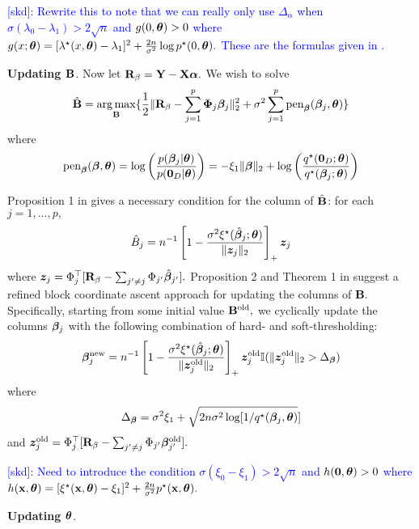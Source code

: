 \textcolor{blue}{[skd]: Rewrite this to note that we can really only use $\Delta_{\alpha}$ when $\sigma(\lambda_{0} - \lambda_{1}) > 2\sqrt{n}$ and $g(0,\boldsymbol{\theta}) > 0$ where $g(x;\boldsymbol{\theta}) = [\lambda^{\star}(x,\boldsymbol{\theta}) - \lambda_{1}]^{2} + \frac{2n}{\sigma^{2}}\log{p^{\star}(0,\boldsymbol{\theta})}.$ These are the formulas given in \citet{Moran2019}.}

\textbf{Updating $\mathbf{B}$}.
Now let $\mathbf{R}_{\beta} = \mathbf{Y} - \mathbf{X} \boldsymbol{\alpha}.$
We wish to solve
$$
\hat{\mathbf{B}} = \operatorname*{arg\,max}_{\mathbf{B}}\{\frac{1}{2}\lVert \mathbf{R}_{\beta} - \sum_{j = 1}^{p}{\boldsymbol{\Phi}_{j}\boldsymbol{\beta}_{j}} \rVert_{2}^{2} + \sigma^{2}\sum_{j = 1}^{p}{\text{pen}_{\boldsymbol{\beta}}(\boldsymbol{\beta}_{j}, \boldsymbol{\theta})} \}
$$
where
$$
\text{pen}_{\boldsymbol{\beta}}(\boldsymbol{\beta}, \boldsymbol{\theta}) = \log\left(\frac{p(\boldsymbol{\beta}_{j}\vert\boldsymbol{\theta})}{p(\mathbf{0}_{D} \vert \boldsymbol{\theta})}\right) = -\xi_{1}\lVert \boldsymbol{\beta} \rVert_{2} + \log{\left(\frac{q^{\star}(\mathbf{0}_{D}; \boldsymbol{\theta})}{q^{\star}(\boldsymbol{\beta}_{j}; \boldsymbol{\theta})}\right)}
$$

Proposition 1 in \citet{Bai2020} gives a necessary condition for the column of $\hat{\mathbf{B}}$: for each $j = 1, \ldots, p,$
$$
\hat{B}_{j} = n^{-1}\left[1 - \frac{\sigma^{2}\xi^{\star}(\hat{\boldsymbol{\beta}}_{j}; \boldsymbol{\theta})}{\lVert \bm{z}_{j} \rVert_{2}}\right]_{+}\bm{z}_{j}
$$
where $\bm{z}_{j} = \Phi_{j}^{\top}[\mathbf{R}_{\beta} - \sum_{j' \neq j}{\Phi_{j'}\hat{\boldsymbol{\beta}}_{j'}}].$
Proposition 2 and Theorem 1 in \citet{Bai2020} suggest a refined block coordinate ascent approach for updating the columns of $\mathbf{B}.$
Specifically, starting from some initial value $\mathbf{B}^{\text{old}},$ we cyclically update the columns $\boldsymbol{\beta}_{j}$ with the following combination of hard- and soft-thresholding:
$$
\boldsymbol{\beta}_{j}^{\text{new}} = n^{-1}\left[1 - \frac{\sigma^{2}\xi^{\star}(\hat{\boldsymbol{\beta}}_{j}; \boldsymbol{\theta})}{\lVert \bm{z}^{\text{old}}_{j} \rVert_{2}}\right]_{+}\bm{z}^{\text{old}}_{j}\mathbb{I}(\lVert \bm{z}^{\text{old}}_{j} \rVert_{2} > \Delta_{\boldsymbol{\beta}})
$$
where
$$
\Delta_{\boldsymbol{\beta}} = \sigma^{2}\xi_{1} + \sqrt{2n\sigma^{2}\log[1/q^{\star}(\boldsymbol{\beta}_{j}, \boldsymbol{\theta})}]
$$
and
$\bm{z}^{\text{old}}_{j} = \Phi_{j}^{\top}[\mathbf{R}_{\beta} - \sum_{j' \neq j}{\Phi_{j'}\boldsymbol{\beta}^{\text{old}}_{j'}}].$

\textcolor{blue}{[skd]: Need to introduce the condition $\sigma(\xi_{0}  - \xi_{1}) > 2\sqrt{n}$ and $h(\mathbf{0}, \boldsymbol{\theta}) > 0$ where $h(\mathbf{x}, \boldsymbol{\theta}) = [\xi^{\star}(\mathbf{x}, \boldsymbol{\theta}) - \xi_{1}]^{2} + \frac{2n}{\sigma^{2}}p^{\star}(\mathbf{x}, \boldsymbol{\theta}).$}


\textbf{Updating $\boldsymbol{\theta}$}.

